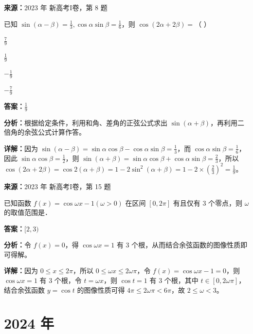 \begin{question}[points=5]
\textbf{来源：}2023 年 新高考I卷，第 8 题\par
已知 $\sin(\alpha-\beta)=\frac{1}{3},\cos\alpha\sin\beta=\frac{1}{6}$，则 $\cos(2\alpha+2\beta)=$（ ）
\begin{choices}
  \item $\frac{7}{9}$
  \item $\frac{1}{9}$
  \item $-\frac{1}{9}$
  \item $-\frac{7}{9}$
\end{choices}
\begin{solution}
\textbf{答案：}$\frac{1}{9}$

\textbf{分析：}根据给定条件，利用和角、差角的正弦公式求出 $\sin(\alpha+\beta)$，再利用二倍角的余弦公式计算作答。

\textbf{详解：}因为 $\sin(\alpha-\beta)=\sin\alpha\cos\beta-\cos\alpha\sin\beta=\frac{1}{3}$，而 $\cos\alpha\sin\beta=\frac{1}{6}$，因此 $\sin\alpha\cos\beta=\frac{1}{2}$，则 $\sin(\alpha+\beta)=\sin\alpha\cos\beta+\cos\alpha\sin\beta=\frac{2}{3}$，所以 $\cos(2\alpha+2\beta)=\cos2(\alpha+\beta)=1-2\sin^2(\alpha+\beta)=1-2\times(\frac{2}{3})^2=\frac{1}{9}$。
\end{solution}
\end{question}

\begin{question}[points=5]
\textbf{来源：}2023 年 新高考I卷，第 15 题\par
已知函数 $f(x)=\cos\omega x-1(\omega>0)$ 在区间 $[0,2\pi]$ 有且仅有 3 个零点，则 $\omega$ 的取值范围是．
\fillin[{$[2,3)$}]
\begin{solution}
\textbf{答案：}$[2,3)$

\textbf{分析：}令 $f(x)=0$，得 $\cos\omega x=1$ 有 3 个根，从而结合余弦函数的图像性质即可得解。

\textbf{详解：}因为 $0\leq x\leq 2\pi$，所以 $0\leq \omega x\leq 2\omega\pi$，令 $f(x)=\cos\omega x-1=0$，则 $\cos\omega x=1$ 有 3 个根，令 $t=\omega x$，则 $\cos t=1$ 有 3 个根，其中 $t\in[0,2\omega\pi]$，结合余弦函数 $y=\cos t$ 的图像性质可得 $4\pi\leq 2\omega\pi < 6\pi$，故 $2\leq \omega < 3$。
\end{solution}
\end{question}

\section*{2024 年}

